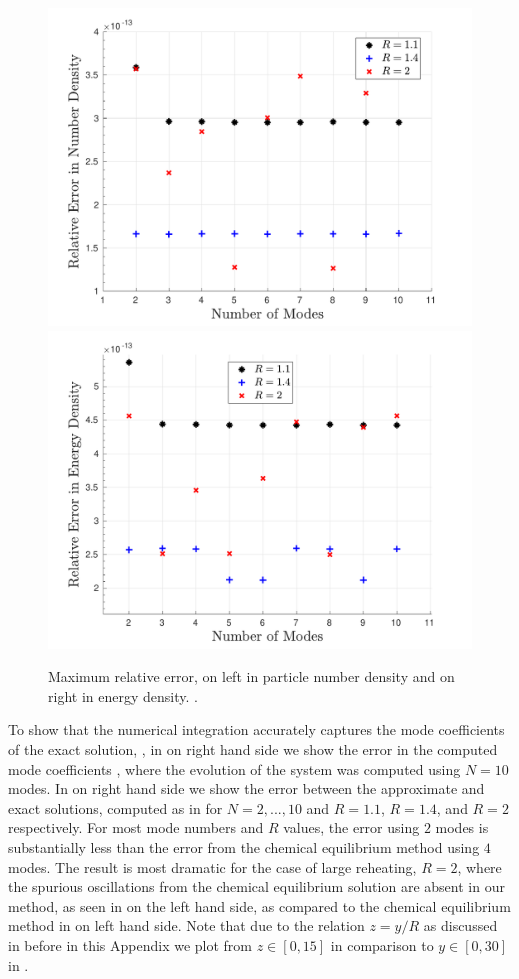 \begin{figure} 
\centerline{\includegraphics[width=0.5\linewidth]{plots/keq_num_err.pdf}\hspace*{-0.5cm}
\includegraphics[width=0.5\linewidth]{plots/keq_E_err.pdf}}
\caption{Maximum relative error, on left in particle number density and on right in energy density. .}\label{fig:keqNumErr}
\end{figure}

To show that the numerical integration accurately captures the mode coefficients of the exact solution, , in  on right hand side %
we show the error in the computed mode coefficients , where the evolution of the system was computed using $N=10$ modes. In  on right hand side we show the error between the approximate and exact solutions, computed as in  for $N=2,...,10$ and $R=1.1$, $R=1.4$, and $R=2$ respectively.  For most mode numbers and $R$ values, the error using $2$ modes is substantially less than the error from the chemical equilibrium method using $4$ modes.  The result is most dramatic for the case of large reheating, $R=2$, where the spurious oscillations from the chemical equilibrium solution are absent in our method, as seen in   on the left hand side, as compared to the chemical equilibrium method in  on left hand side.  Note that due to the relation $z=y/R$ as discussed in before in this Appendix we plot from $z\in [0,15]$ in comparison to $y\in[0,30]$ in  .


